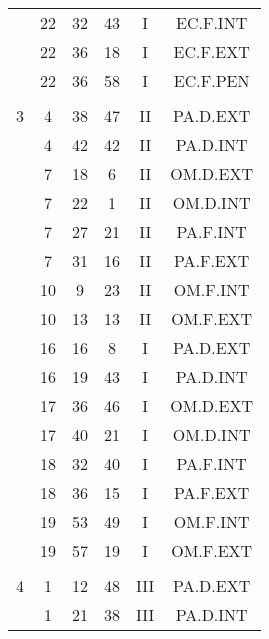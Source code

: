 \documentclass[12pt, a4paper]{article}
\begin{document}
\begin{multicols}{3}
{\begin{tabular}{c c c c c c}
	 	 	 	 & 22 & 32 & 43 & I & EC.F.INT\\%
	 	 	 	 & 22 & 36 & 18 & I & EC.F.EXT\\%
	 	 	 	 & 22 & 36 & 58 & I & EC.F.PEN\\%
	 	 	 	 & & & & & \\%
	 	 	 	3 & 4 & 38 & 47 & II & PA.D.EXT\\%
	 	 	 	 & 4 & 42 & 42 & II & PA.D.INT\\%
	 	 	 	 & 7 & 18 & 6 & II & OM.D.EXT\\%
	 	 	 	 & 7 & 22 & 1 & II & OM.D.INT\\%
	 	 	 	 & 7 & 27 & 21 & II & PA.F.INT\\%
	 	 	 	 & 7 & 31 & 16 & II & PA.F.EXT\\%
	 	 	 	 & 10 & 9 & 23 & II & OM.F.INT\\%
	 	 	 	 & 10 & 13 & 13 & II & OM.F.EXT\\%
	 	 	 	 & 16 & 16 & 8 & I & PA.D.EXT\\%
	 	 	 	 & 16 & 19 & 43 & I & PA.D.INT\\%
	 	 	 	 & 17 & 36 & 46 & I & OM.D.EXT\\%
	 	 	 	 & 17 & 40 & 21 & I & OM.D.INT\\%
	 	 	 	 & 18 & 32 & 40 & I & PA.F.INT\\%
	 	 	 	 & 18 & 36 & 15 & I & PA.F.EXT\\%
	 	 	 	 & 19 & 53 & 49 & I & OM.F.INT\\%
	 	 	 	 & 19 & 57 & 19 & I & OM.F.EXT\\%
	 	 	 	 & & & & & \\%
	 	 	 	4 & 1 & 12 & 48 & III & PA.D.EXT\\%
	 	 	 	 & 1 & 21 & 38 & III & PA.D.INT\\%

\end{tabular}}
\end{multicols}
\end{document}
